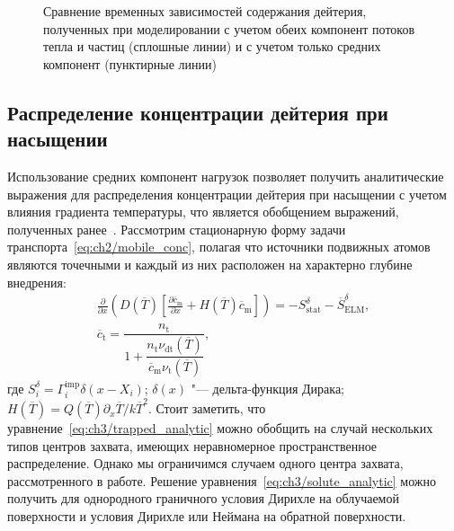 \begin{figure}[ht]
	\caption{Сравнение временных зависимостей содержания дейтерия, полученных при моделировании с учетом обеих компонент потоков тепла и частиц (сплошные линии) и с учетом только средних компонент (пунктирные линии)}\label{fig:ch3/Eqv_load}
\end{figure}

\subsection{Распределение концентрации дейтерия при насыщении}\label{sec:ch3/sec3/subsec2}
Использование средних компонент нагрузок позволяет получить аналитические выражения для распределения концентрации дейтерия при насыщении с учетом влияния градиента температуры, что является обобщением выражений, полученных ранее~\cite{Denis2022}. Рассмотрим стационарную форму задачи транспорта~\cref{eq:ch2/mobile_conc}, полагая что источники подвижных атомов являются точечными и каждый из них расположен на характерно глубине внедрения:
\begin{subequations}
	\begin{gather}
	\frac{\partial}{\partial x}\left(D(\overline{T})\left[\frac{\partial \overline{c}_{\mathrm{m}}}{\partial x} +H(\overline{T})\overline{c}_{\mathrm{m}}\right] \right)= - S_{\mathrm{stat}}^{\delta}-\overline{S}_{\mathrm{ELM}}^{\delta}, \label{eq:ch3/solute_analytic}\\
	\overline{c}_{\mathrm{t}}=\dfrac{n_{\mathrm{t}}}{1+\dfrac{n_{\mathrm{t}}\nu_{\mathrm{dt}}(\overline{T})}{\overline{c}_{\mathrm{m}}\nu_{\mathrm{t}}(\overline{T})}},\label{eq:ch3/trapped_analytic}
	\end{gather}
\end{subequations}
где $S_i^\delta=\Gamma_i^{\mathrm{imp}}\delta(x-X_i)$; $\delta(x)$ "--- дельта-функция Дирака; $H(\overline{T})=Q(\overline{T})\partial_x \overline{T}/k\overline{T}^2$. Стоит заметить, что уравнение~\cref{eq:ch3/trapped_analytic} можно обобщить на случай нескольких типов центров захвата, имеющих неравномерное пространственное распределение. Однако мы ограничимся случаем одного центра захвата, рассмотренного в работе. Решение уравнения~\cref{eq:ch3/solute_analytic} можно получить для однородного граничного условия Дирихле на облучаемой поверхности и условия Дирихле или Неймана на обратной поверхности.

